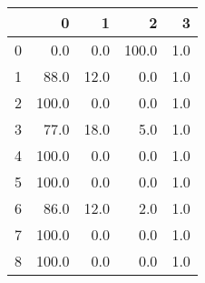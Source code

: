\begin{tabular}{lrrrr}
\toprule
{} &      0 &     1 &      2 &    3 \\
\midrule
0 &    0.0 &   0.0 &  100.0 &  1.0 \\
1 &   88.0 &  12.0 &    0.0 &  1.0 \\
2 &  100.0 &   0.0 &    0.0 &  1.0 \\
3 &   77.0 &  18.0 &    5.0 &  1.0 \\
4 &  100.0 &   0.0 &    0.0 &  1.0 \\
5 &  100.0 &   0.0 &    0.0 &  1.0 \\
6 &   86.0 &  12.0 &    2.0 &  1.0 \\
7 &  100.0 &   0.0 &    0.0 &  1.0 \\
8 &  100.0 &   0.0 &    0.0 &  1.0 \\
\bottomrule
\end{tabular}
